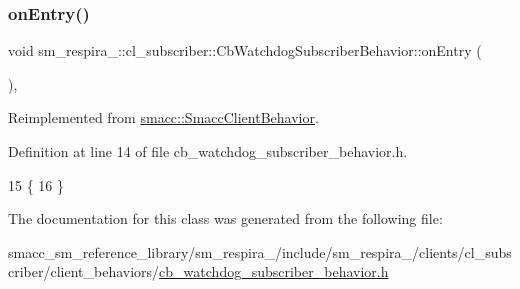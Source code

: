 \subsubsection{\texorpdfstring{on\+Entry()}{onEntry()}}
{\footnotesize\ttfamily void sm\+\_\+respira\+\_\+::cl\+\_\+subscriber\+::\+Cb\+Watchdog\+Subscriber\+Behavior\+::on\+Entry (\begin{DoxyParamCaption}{ }\end{DoxyParamCaption})\hspace{0.3cm}{\ttfamily [inline]}, {\ttfamily [virtual]}}



Reimplemented from \hyperlink{classsmacc_1_1SmaccClientBehavior_ad5d3e1f1697c3cfe66c94cadba948493}{smacc\+::\+Smacc\+Client\+Behavior}.



Definition at line 14 of file cb\+\_\+watchdog\+\_\+subscriber\+\_\+behavior.\+h.


\begin{DoxyCode}
15     \{
16     \}
\end{DoxyCode}


The documentation for this class was generated from the following file\+:\begin{DoxyCompactItemize}
\item 
smacc\+\_\+sm\+\_\+reference\+\_\+library/sm\+\_\+respira\+\_/include/sm\+\_\+respira\+\_/clients/cl\+\_\+subscriber/client\+\_\+behaviors/\hyperlink{sm__respira__1_2include_2sm__respira__1_2clients_2cl__subscriber_2client__behaviors_2cb__watchdog__subscriber__behavior_8h}{cb\+\_\+watchdog\+\_\+subscriber\+\_\+behavior.\+h}\end{DoxyCompactItemize}
